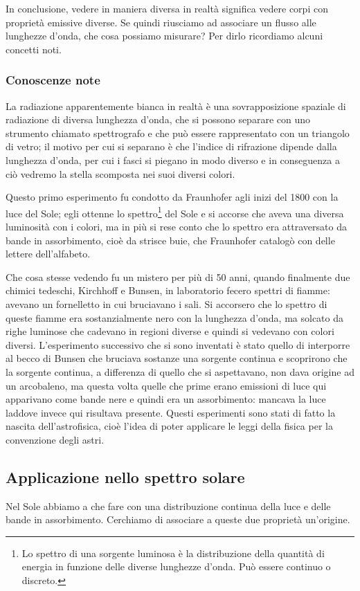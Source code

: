 In conclusione, vedere in maniera diversa in realtà significa vedere corpi con proprietà emissive diverse. Se quindi riusciamo ad associare un flusso alle lunghezze d'onda, che cosa possiamo misurare? Per dirlo ricordiamo alcuni concetti noti.

\subsubsection{Conoscenze note}
La radiazione apparentemente bianca in realtà è una sovrapposizione spaziale di radiazione di diversa lunghezza d'onda, che si possono separare con uno strumento chiamato spettrografo e che può essere rappresentato con un triangolo di vetro; il motivo per cui si separano è che l'indice di rifrazione dipende dalla lunghezza d'onda, per cui i fasci si piegano in modo diverso e in conseguenza a ciò vedremo la stella scomposta nei suoi diversi colori.

Questo primo esperimento fu condotto da Fraunhofer agli inizi del 1800 con la luce del Sole; egli ottenne lo spettro\footnote{Lo spettro di una sorgente luminosa è la distribuzione della quantità di energia in funzione delle diverse lunghezze d'onda. Può essere continuo o discreto.} del Sole e si accorse che aveva una diversa luminosità con i colori, ma in più si rese conto che lo spettro era attraversato da bande in assorbimento, cioè da strisce buie, che Fraunhofer catalogò con delle lettere dell'alfabeto.

Che cosa stesse vedendo fu un mistero per più di 50 anni, quando finalmente due chimici tedeschi, Kirchhoff e Bunsen, in laboratorio fecero spettri di fiamme: avevano un fornelletto in cui bruciavano i sali. Si accorsero che lo spettro di queste fiamme era sostanzialmente nero con la lunghezza d'onda, ma solcato da righe luminose che cadevano in regioni diverse e quindi si vedevano con colori diversi. L'esperimento successivo che si sono inventati è stato quello di interporre al becco di Bunsen che bruciava sostanze una sorgente continua e scoprirono che la sorgente continua, a differenza di quello che si aspettavano, non dava origine ad un arcobaleno, ma questa volta quelle che prime erano emissioni di luce qui apparivano come bande nere e quindi era un assorbimento: mancava la luce laddove invece qui risultava presente. Questi esperimenti sono stati di fatto la nascita dell'astrofisica, cioè l'idea di poter applicare le leggi della fisica per la convenzione degli astri. 

\subsection{Applicazione nello spettro solare}
Nel Sole abbiamo a che fare con una distribuzione continua della luce e delle bande in assorbimento. Cerchiamo di associare a queste due proprietà un'origine.

